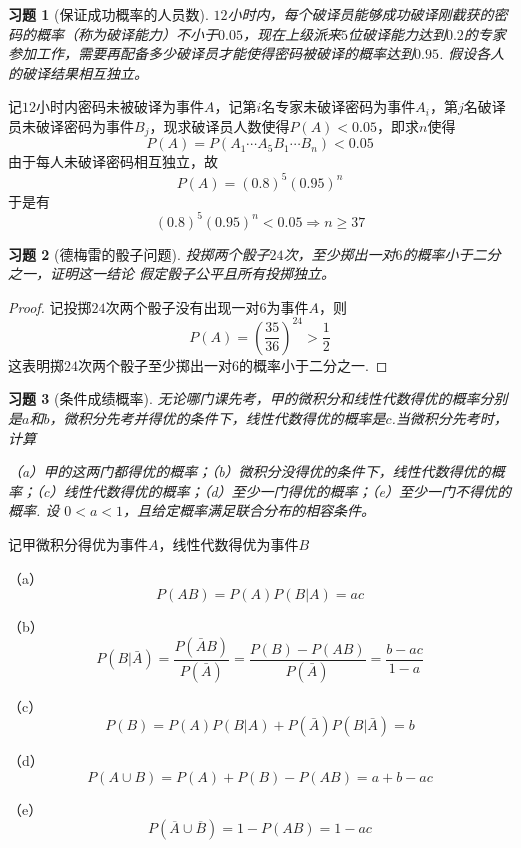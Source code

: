 \documentclass[UTF8,12pt,a4paper,fontset=fandol]{ctexart}
\newtheorem{exercise}{习题}[section]
\begin{document}
\begin{exercise}[保证成功概率的人员数]\label{q:Y2.9}
$12$小时内，每个破译员能够成功破译刚截获的密码的概率（称为破译能力）不小于$0.05$，现在上级派来$5$位破译能力达到$0.2$的专家参加工作，需要再配备多少破译员才能使得密码被破译的概率达到$0.95$. 假设各人的破译结果相互独立。\par{}
\end{exercise}

\begin{solve}\label{a:Y2.9}
记$12$小时内密码未被破译为事件$A$，记第$i$名专家未破译密码为事件$A_i$，第$j$名破译员未破译密码为事件$B_j$，现求破译员人数使得$P(A)<0.05$，即求$n$使得
\[P(A) = P({A_1} \cdots {A_5}{B_1} \cdots {B_n}) < 0.05\]
由于每人未破译密码相互独立，故
\[P(A) = {(0.8)^5}{(0.95)^n}\]
于是有
\[{(0.8)^5}{(0.95)^n} < 0.05 \Rightarrow n \geqslant 37\]
\end{solve}

\begin{exercise}[德梅雷的骰子问题]\label{q:Y2.10}
投掷两个骰子$24$次，至少掷出一对$6$的概率小于二分之一，证明这一结论 假定骰子公平且所有投掷独立。\par{}
\end{exercise}

\begin{proof}\label{a:Y2.10}
记投掷$24$次两个骰子没有出现一对$6$为事件$A$，则
\[P(A) = {\left( {\frac{{35}}{{36}}} \right)^{24}} > \frac{1}{2}\]
这表明掷$24$次两个骰子至少掷出一对$6$的概率小于二分之一.
\end{proof}

\begin{exercise}[条件成绩概率]\label{q:Y2.11}
无论哪门课先考，甲的微积分和线性代数得优的概率分别是$a$和$b$，微积分先考并得优的条件下，线性代数得优的概率是$c$.当微积分先考时，计算

（a）甲的这两门都得优的概率；（b）微积分没得优的条件下，线性代数得优的概率；（c）线性代数得优的概率；（d）至少一门得优的概率；（e）至少一门不得优的概率. 设 $0<a<1$，且给定概率满足联合分布的相容条件。\par{}
\end{exercise}

\begin{solve}\label{a:Y2.11}
记甲微积分得优为事件$A$，线性代数得优为事件$B$

（a）
\[P(AB) = P(A)P(B|A) = ac\]

（b）\[P(B|\bar A) = \frac{{P(\bar AB)}}{{P(\bar A)}} = \frac{{P(B) - P(AB)}}{{P(\bar A)}} = \frac{{b - ac}}{{1 - a}}\]

（c）
\[P(B) = P(A)P(B|A) + P(\bar A)P(B|\bar A) = b\]

（d）
\[P(A \cup B) = P(A) + P(B) - P(AB) = a + b - ac\]

（e）
\[P(\overline A  \cup \overline B ) = 1 - P(AB) = 1 - ac\]
\end{solve}
\end{document}
